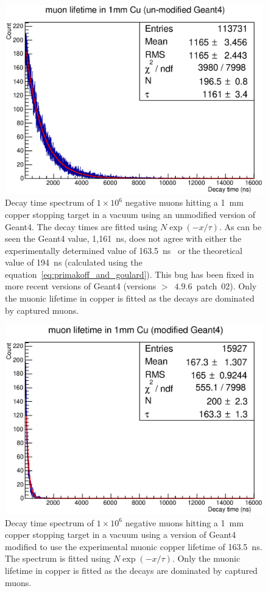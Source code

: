 \begin{figure}[hptb]
  \centering
    \includegraphics[width=.7\textwidth]{images/mu-_lifetime_in_cu_unmodded_g4.eps}
  \caption{Decay time spectrum of \(1\times10^6\) negative muons hitting a 1~mm copper stopping target in a vacuum using an unmodified version of Geant4. The decay times are fitted using \(N\exp(-x/\tau)\). As can be seen the Geant4 value, 1,161~ns, does not agree with either the experimentally determined value of 163.5~ns~\cite{suzuki_mu_capture_rates} or the theoretical value of 194~ns (calculated using the equation~\ref{eq:primakoff_and_goulard}). This bug has been fixed in more recent versions of Geant4 (versions \(>\)~\( 4.9.6 \)~patch~02). Only the muonic lifetime in copper is fitted as the decays are dominated by captured muons.}
  \label{fig:images_mu-_lifetime_in_cu_unmodded_g4}
\end{figure}

\begin{figure}[hptb]
  \centering
    \includegraphics[width=.7\textwidth]{images/mu-_lifetime_in_cu_modded_g4.eps}
  \caption{Decay time spectrum of \(1\times10^6\) negative muons hitting a 1~mm copper stopping target in a vacuum using a version of Geant4 modified to use the experimental muonic copper lifetime of 163.5~ns. The spectrum is fitted using \(N\exp(-x/\tau)\). Only the muonic lifetime in copper is fitted as the decays are dominated by captured muons.}
  \label{fig:images_mu-_lifetime_in_cu_modded_g4}
\end{figure}


